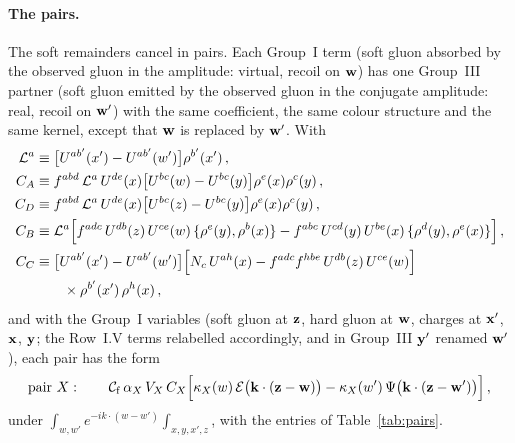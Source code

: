 \paragraph{The pairs.} The soft remainders cancel in pairs. Each Group~I term (soft gluon absorbed by the observed gluon in the amplitude: virtual, recoil on $\mathbf{w}$) has one Group~III partner (soft gluon emitted by the observed gluon in the conjugate amplitude: real, recoil on $\mathbf{w}'$) with the same coefficient, the same colour structure and the same kernel, except that $\mathbf{w}$ is replaced by $\mathbf{w}'$. With
\begin{align}\label{eq:CABCD}
\mathcal L^a&\equiv\big[U^{ab'}(x')-U^{ab'}(w')\big]\rho^{b'}(x')\,,\notag\\
C_A&\equiv f^{abd}\,\mathcal L^a\,U^{de}(x)\big[U^{bc}(w)-U^{bc}(y)\big]\rho^e(x)\rho^c(y)\,,\notag\\
C_D&\equiv f^{abd}\,\mathcal L^a\,U^{de}(x)\big[U^{bc}(z)-U^{bc}(y)\big]\rho^e(x)\rho^c(y)\,,\notag\\
C_B&\equiv\mathcal L^a\Big[f^{adc}\,U^{db}(z)\,U^{ce}(w)\,\{\rho^e(y),\rho^b(x)\}-f^{abc}\,U^{cd}(y)\,U^{be}(x)\,\{\rho^d(y),\rho^e(x)\}\Big]\,,\notag\\
C_C&\equiv\big[U^{ab'}(x')-U^{ab'}(w')\big]\Big[N_c\,U^{ah}(x)-f^{adc}f^{hbe}\,U^{db}(z)\,U^{ce}(w)\Big]\notag\\&\qquad\times\rho^{b'}(x')\,\rho^h(x)\,,
\end{align}
and with the Group~I variables (soft gluon at $\mathbf{z}$, hard gluon at $\mathbf{w}$, charges at $\mathbf{x}'$, $\mathbf{x}$, $\mathbf{y}$; the Row~I.V terms relabelled accordingly, and in Group~III $\mathbf{y}'$ renamed $\mathbf{w}'$), each pair has the form
\begin{align}\label{eq:pair}
\text{pair }X:\qquad\mathcal C_{\rm f}\,\alpha_X\,V_X\,C_X\Big[\kappa_X(w)\,\mathcal E\big(\mathbf{k}\cdot(\mathbf{z}-\mathbf{w})\big)-\kappa_X(w')\,\Psi\big(\mathbf{k}\cdot(\mathbf{z}-\mathbf{w}')\big)\Big]\,,
\end{align}
under $\int_{w,w'}e^{-ik\cdot(w-w')}\int_{x,y,x',z}$, with the entries of Table~\ref{tab:pairs}.
